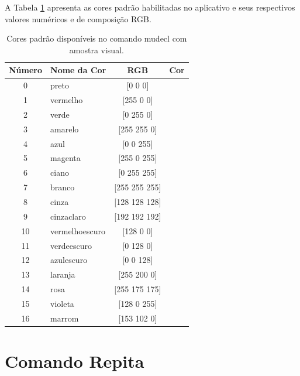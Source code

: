 \documentclass[12pt,a4paper]{report}
\begin{document}
	A Tabela \ref{tab:cores} apresenta as cores padrão habilitadas no aplicativo e seus respectivos valores numéricos e de composição RGB.
	
	\begin{table}[H]
		\centering
		\caption{Cores padrão disponíveis no comando mudecl com amostra visual.}
		
		\begin{tabular}{|c|l|c|c|}
			\hline
			\textbf{Número} & \textbf{Nome da Cor} & \textbf{RGB} & \textbf{Cor} \\ \hline
			0 & preto & [0 0 0] & \cellcolor[HTML]{000000} \\ \hline
			1 & vermelho & [255 0 0] & \cellcolor[HTML]{FF0000} \\ \hline
			2 & verde & [0 255 0] & \cellcolor[HTML]{00FF00} \\ \hline
			3 & amarelo & [255 255 0] & \cellcolor[HTML]{FFFF00} \\ \hline
			4 & azul & [0 0 255] & \cellcolor[HTML]{0000FF} \\ \hline
			5 & magenta & [255 0 255] & \cellcolor[HTML]{FF00FF} \\ \hline
			6 & ciano & [0 255 255] & \cellcolor[HTML]{00FFFF} \\ \hline
			7 & branco & [255 255 255] & \cellcolor[HTML]{FFFFFF} \\ \hline
			8 & cinza & [128 128 128] & \cellcolor[HTML]{808080} \\ \hline
			9 & cinzaclaro & [192 192 192] & \cellcolor[HTML]{C0C0C0} \\ \hline
			10 & vermelhoescuro & [128 0 0] & \cellcolor[HTML]{800000} \\ \hline
			11 & verdeescuro & [0 128 0] & \cellcolor[HTML]{008000} \\ \hline
			12 & azulescuro & [0 0 128] & \cellcolor[HTML]{000080} \\ \hline
			13 & laranja & [255 200 0] & \cellcolor[HTML]{FFC800} \\ \hline
			14 & rosa & [255 175 175] & \cellcolor[HTML]{FFAFAF} \\ \hline
			15 & violeta & [128 0 255] & \cellcolor[HTML]{8000FF} \\ \hline
			16 & marrom & [153 102 0] & \cellcolor[HTML]{996600} \\ \hline
		\end{tabular}
		\label{tab:cores}
	\end{table}
	
	\section{Comando Repita}
	
\end{document}
